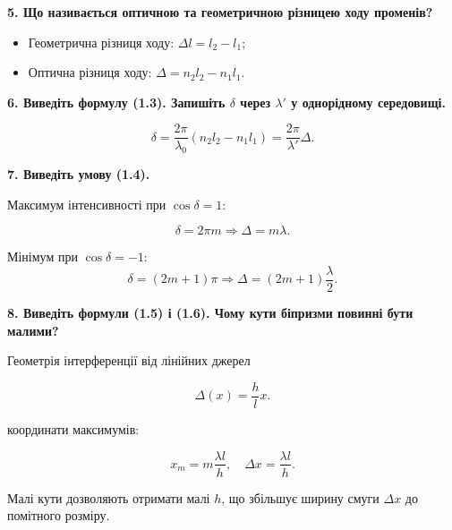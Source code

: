 \documentclass[12pt,a4paper]{article}
\begin{document}
    \vspace{1em}
    \setlength{\parindent}{0pt}

    \textbf{5. Що називається оптичною та геометричною різницею ходу променів?}

    \setlength{\parindent}{1.5em}

    \begin{itemize}
    \item Геометрична різниця ходу: $\Delta l = l_2 - l_1$;
    \item Оптична різниця ходу: $\Delta = n_2 l_2 - n_1 l_1$.
    \end{itemize}

    \vspace{1em}
    \setlength{\parindent}{0pt}

    \textbf{6. Виведіть формулу (1.3). Запишіть $\delta$ через $\lambda'$ у однорідному середовищі.}
    \setlength{\parindent}{1.5em}

    \[ \delta = \frac{2\pi}{\lambda_0} (n_2 l_2 - n_1 l_1) = \frac{2\pi}{\lambda'} \Delta. \]

    \vspace{1em}
    \setlength{\parindent}{0pt}

    \textbf{7. Виведіть умову (1.4).}

    \setlength{\parindent}{1.5em}

    Максимум інтенсивності при $\cos\delta = 1$:

    \[ \delta = 2\pi m \Rightarrow \Delta = m \lambda. \]

    Мінімум при $\cos\delta = -1$:
    \[ \delta = (2m + 1)\pi \Rightarrow \Delta = (2m+1)\frac{\lambda}{2}. \]

    \vspace{1em}

    \setlength{\parindent}{0pt}

    \textbf{8. Виведіть формули (1.5) і (1.6). Чому кути біпризми повинні бути малими?}

    \setlength{\parindent}{1.5em}

    Геометрія інтерференції від лінійних джерел

    \[ \Delta(x) = \frac{h}{l}x. \]

    координати максимумів:

    \[ x_m = m \frac{\lambda l}{h}, \quad \Delta x = \frac{\lambda l}{h}. \]

    Малі кути дозволяють отримати малі $h$, що збільшує ширину смуги $\Delta x$ до помітного розміру.
\end{document}
